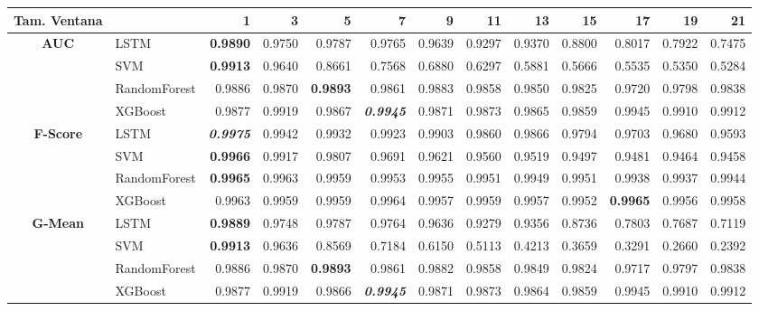 \begin{table}[H]
	\centering
	\begin{adjustbox}{max width=14cm}
		\begin{tabular}{|c|l|r|r|r|r|r|r|r|r|r|r|r|}
			\hline
			\textbf{Tam. Ventana}&         &      1  &      3  &      5  &      7  &      9  &      11 &      13 &      15 &      17 &      19 &      21 \\
			\hline
			\textbf{AUC} &  LSTM & \textbf{  0.9890 } &  0.9750 &  0.9787 &  0.9765 &  0.9639 &  0.9297 &  0.9370 &  0.8800 &  0.8017 &  0.7922 &  0.7475 \\
			&  SVM & \textbf{  0.9913 } &  0.9640 &  0.8661 &  0.7568 &  0.6880 &  0.6297 &  0.5881 &  0.5666 &  0.5535 &  0.5350 &  0.5284 \\
			&  RandomForest &  0.9886 &  0.9870 & \textbf{  0.9893 } &  0.9861 &  0.9883 &  0.9858 &  0.9850 &  0.9825 &  0.9720 &  0.9798 &  0.9838 \\
			&  XGBoost &  0.9877 &  0.9919 &  0.9867 & \textit{ \textbf{  0.9945 } } &  0.9871 &  0.9873 &  0.9865 &  0.9859 &  0.9945 &  0.9910 &  0.9912 \\
			\hline
			\textbf{F-Score} &  LSTM & \textit{ \textbf{  0.9975 } } &  0.9942 &  0.9932 &  0.9923 &  0.9903 &  0.9860 &  0.9866 &  0.9794 &  0.9703 &  0.9680 &  0.9593 \\
			&  SVM & \textbf{  0.9966 } &  0.9917 &  0.9807 &  0.9691 &  0.9621 &  0.9560 &  0.9519 &  0.9497 &  0.9481 &  0.9464 &  0.9458 \\
			&  RandomForest & \textbf{  0.9965 } &  0.9963 &  0.9959 &  0.9953 &  0.9955 &  0.9951 &  0.9949 &  0.9951 &  0.9938 &  0.9937 &  0.9944 \\
			&  XGBoost &  0.9963 &  0.9959 &  0.9959 &  0.9964 &  0.9957 &  0.9959 &  0.9957 &  0.9952 & \textbf{  0.9965 } &  0.9956 &  0.9958 \\
			\hline
			\textbf{G-Mean} &  LSTM & \textbf{  0.9889 } &  0.9748 &  0.9787 &  0.9764 &  0.9636 &  0.9279 &  0.9356 &  0.8736 &  0.7803 &  0.7687 &  0.7119 \\
			&  SVM & \textbf{  0.9913 } &  0.9636 &  0.8569 &  0.7184 &  0.6150 &  0.5113 &  0.4213 &  0.3659 &  0.3291 &  0.2660 &  0.2392 \\
			&  RandomForest &  0.9886 &  0.9870 & \textbf{  0.9893 } &  0.9861 &  0.9882 &  0.9858 &  0.9849 &  0.9824 &  0.9717 &  0.9797 &  0.9838 \\
			&  XGBoost &  0.9877 &  0.9919 &  0.9866 & \textit{ \textbf{  0.9945 } } &  0.9871 &  0.9873 &  0.9864 &  0.9859 &  0.9945 &  0.9910 &  0.9912 \\

\end{tabular}
\end{adjustbox}
\end{table}
